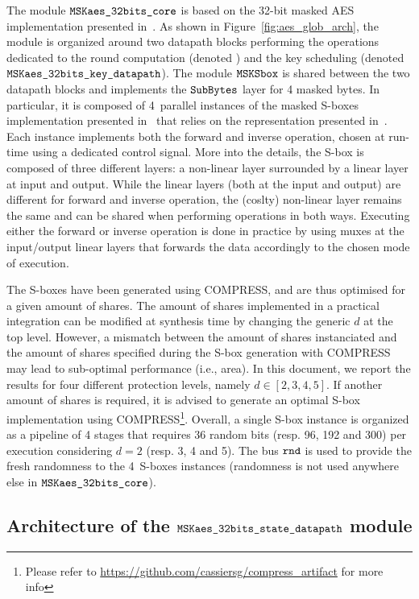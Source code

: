 \documentclass{scrartcl}
\begin{document}
The module $\texttt{MSKaes\_32bits\_core}$ is based on the 32-bit masked AES implementation
presented in~\cite{DBLP:conf/cosade/MominCS22}. As shown in
Figure~\ref{fig:aes_glob_arch}, the module is organized around two datapath
blocks performing the operations dedicated to the round computation (denoted
\modAESdpState) and the key scheduling (denoted $\texttt{MSKaes\_32bits\_key\_datapath}$). The module
$\texttt{MSKSbox}$ is shared between the two datapath blocks and implements the
$\texttt{SubBytes}$ layer for 4 masked bytes. In particular, it is composed of 4~parallel
instances of the masked S-boxes implementation presented
in~\cite{DBLP:journals/tches/CassiersGMMN24} that relies on the representation
presented in~\cite{DBLP:conf/ches/Canright05}.  Each instance implements both
the forward and inverse operation, chosen at run-time using a dedicated control
signal. More into the details, the S-box is composed of three different layers:
a non-linear layer surrounded by a linear layer at input and output. While the
linear layers (both at the input and output) are different for forward and
inverse operation, the (coslty) non-linear layer remains the same and can be
shared when performing operations in both ways.  Executing either the forward
or inverse operation is done in practice by using muxes at the input/output
linear layers that forwards the data accordingly to the chosen mode of execution. 

The S-boxes have been generated using COMPRESS, and are thus optimised for a
given amount of shares. The amount of shares implemented in a practical
integration can be modified at synthesis time by changing the generic $d$ at
the top level. However, a mismatch between the amount of shares instanciated
and the amount of shares specified during the S-box generation with COMPRESS
may lead to sub-optimal performance (i.e., area). In this
document, we report the results for four different protection levels, namely
$d\in[2,3,4,5]$. If another amount of shares is required, it is advised to
generate an optimal S-box implementation using COMPRESS\footnote{Please refer
    to
    \href{https://github.com/cassiersg/compress_artifact}{https://github.com/cassiersg/compress\_artifact}
for more info}.  Overall, a single S-box instance is organized as a pipeline of 4 stages that
requires 36 random bits (resp. 96, 192 and 300) per execution considering $d=2$
(resp. 3, 4 and 5). The bus $\texttt{rnd}$ is used to provide the fresh
randomness to the 4~S-boxes instances (randomness is not used anywhere else in
$\texttt{MSKaes\_32bits\_core}$). 

\subsection{Architecture of the $\texttt{MSKaes\_32bits\_state\_datapath}$ module}
\label{sec:architecture}
\end{document}
